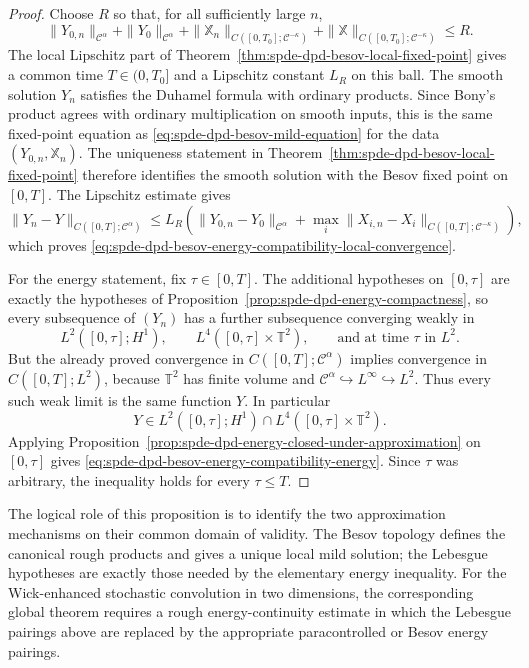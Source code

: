 \begin{proof}
Choose \(R\) so that, for all sufficiently large \(n\),
\[
  \|Y_{0,n}\|_{\mathcal C^\alpha}
  +\|Y_0\|_{\mathcal C^\alpha}
  +\|\mathbb X_n\|_{C([0,T_0];\mathcal C^{-\kappa})}
  +\|\mathbb X\|_{C([0,T_0];\mathcal C^{-\kappa})}
  \leq R .
\]
The local Lipschitz part of
Theorem~\ref{thm:spde-dpd-besov-local-fixed-point} gives a common time
\(T\in(0,T_0]\) and a Lipschitz constant \(L_R\) on this ball.  The smooth
solution \(Y_n\) satisfies the Duhamel formula with ordinary products.
Since Bony's product agrees with ordinary multiplication on smooth inputs,
this is the same fixed-point equation as
\eqref{eq:spde-dpd-besov-mild-equation} for the data
\((Y_{0,n},\mathbb X_n)\).  The uniqueness statement in
Theorem~\ref{thm:spde-dpd-besov-local-fixed-point} therefore identifies
the smooth solution with the Besov fixed point on \([0,T]\).  The Lipschitz
estimate gives
\[
  \|Y_n-Y\|_{C([0,T];\mathcal C^\alpha)}
  \leq
  L_R
  \left(
    \|Y_{0,n}-Y_0\|_{\mathcal C^\alpha}
    +
    \max_i
    \|X_{i,n}-X_i\|_{C([0,T];\mathcal C^{-\kappa})}
  \right),
\]
which proves
\eqref{eq:spde-dpd-besov-energy-compatibility-local-convergence}.

For the energy statement, fix \(\tau\in[0,T]\).  The additional hypotheses
on \([0,\tau]\) are exactly the hypotheses of
Proposition~\ref{prop:spde-dpd-energy-compactness}, so every subsequence of
\((Y_n)\) has a further subsequence converging weakly in
\[
  L^2([0,\tau];H^1),\qquad L^4([0,\tau]\times\mathbb T^2),
  \qquad\text{and at time }\tau\text{ in }L^2.
\]
But the already proved convergence in \(C([0,T];\mathcal C^\alpha)\)
implies convergence in \(C([0,T];L^2)\), because
\(\mathbb T^2\) has finite volume and
\(\mathcal C^\alpha\hookrightarrow L^\infty\hookrightarrow L^2\).
Thus every such weak limit is the same function \(Y\).  In particular
\[
  Y\in L^2([0,\tau];H^1)\cap L^4([0,\tau]\times\mathbb T^2).
\]
Applying
Proposition~\ref{prop:spde-dpd-energy-closed-under-approximation} on
\([0,\tau]\) gives
\eqref{eq:spde-dpd-besov-energy-compatibility-energy}.  Since \(\tau\) was
arbitrary, the inequality holds for every \(\tau\leq T\).
\end{proof}

The logical role of this proposition is to identify the two approximation
mechanisms on their common domain of validity.  The Besov topology defines
the canonical rough products and gives a unique local mild solution; the
Lebesgue hypotheses are exactly those needed by the elementary energy
inequality.  For the Wick-enhanced stochastic convolution in two dimensions,
the corresponding global theorem requires a rough energy-continuity estimate
in which the Lebesgue pairings above are replaced by the appropriate
paracontrolled or Besov energy pairings.

